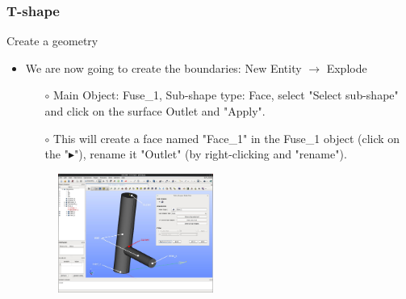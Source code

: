 \documentclass[10pt, hyperref={unicode=true,pdfusetitle, bookmarks=true,bookmarksnumbered=false,bookmarksopen=false, breaklinks=false,pdfborder={0 0 1},backref=true,colorlinks=true,linkcolor=darkblue,pageanchor}]{beamer}
\begin{document}
\begin{frame}
\frametitle{T-shape}
\begin{block}{Create a geometry}

\begin{itemize}
\item We are now going to create the boundaries: New Entity $\rightarrow$ Explode \\
    \begin{itemize}
    \item [$\circ$] Main Object: Fuse\_1, Sub-shape type: Face, select "Select sub-shape" and click on the surface Outlet and "Apply".
    \item [$\circ$] This will create a face named "Face\_1" in the Fuse\_1 object (click on the "$\blacktriangleright$"), rename it "Outlet" (by right-clicking and "rename").
    \end{itemize}

\begin{figure}
\includegraphics[width=0.48\textwidth]{PICTURES/salome15.jpg}
\end{figure}
\end{itemize}

\end{block}
\end{frame}
\end{document}
